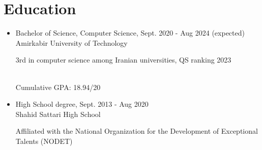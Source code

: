 \section{Education}
\begin{itemize}
\item{Bachelor of Science, Computer Science}, \hfill Sept. 2020 - Aug 2024 (expected) \\
Amirkabir University of Technology 
\begin{footnotesize} 
3rd in computer science among Iranian universities, QS ranking 2023 
\end{footnotesize} \\ 
Cumulative GPA: 18.94/20
 \item{High School degree}, \hfill Sept. 2013 - Aug 2020 \\
 Shahid Sattari High School \\ 
 \begin{footnotesize} Affiliated with the National Organization for the Development of Exceptional Talents (NODET) 
 \end{footnotesize}
\end{itemize}
